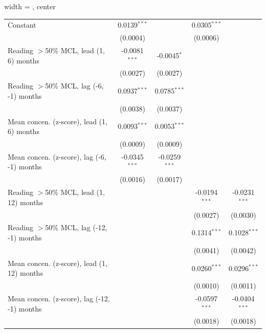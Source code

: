 \begin{table}[htbp]
\begin{adjustbox}{width = \textwidth, center}
\begin{tabular}{lcccc}
         \midrule 
         Constant                                     & 0.0139$^{***}$  &                 & 0.0305$^{***}$  &   \\   
                                                      & (0.0004)        &                 & (0.0006)        &   \\   
         Reading $>$50\% MCL, lead (1, 6) months      & -0.0081$^{***}$ & -0.0045$^{*}$   &                 &   \\   
                                                      & (0.0027)        & (0.0027)        &                 &   \\   
         Reading $>$50\% MCL, lag (-6, -1) months     & 0.0937$^{***}$  & 0.0785$^{***}$  &                 &   \\   
                                                      & (0.0038)        & (0.0037)        &                 &   \\   
         Mean concen. (z-score), lead (1, 6) months   & 0.0093$^{***}$  & 0.0053$^{***}$  &                 &   \\   
                                                      & (0.0009)        & (0.0009)        &                 &   \\   
         Mean concen. (z-score), lag (-6, -1) months  & -0.0345$^{***}$ & -0.0259$^{***}$ &                 &   \\   
                                                      & (0.0016)        & (0.0017)        &                 &   \\   
         Reading $>$50\% MCL, lead (1, 12) months     &                 &                 & -0.0194$^{***}$ & -0.0231$^{***}$\\   
                                                      &                 &                 & (0.0027)        & (0.0030)\\   
         Reading $>$50\% MCL, lag (-12, -1) months    &                 &                 & 0.1314$^{***}$  & 0.1028$^{***}$\\   
                                                      &                 &                 & (0.0041)        & (0.0042)\\   
         Mean concen. (z-score), lead (1, 12) months  &                 &                 & 0.0260$^{***}$  & 0.0296$^{***}$\\   
                                                      &                 &                 & (0.0010)        & (0.0011)\\   
         Mean concen. (z-score), lag (-12, -1) months &                 &                 & -0.0597$^{***}$ & -0.0404$^{***}$\\   
                                                      &                 &                 & (0.0018)        & (0.0018)\\   
         

\end{tabular}
\end{adjustbox}
\end{table}
